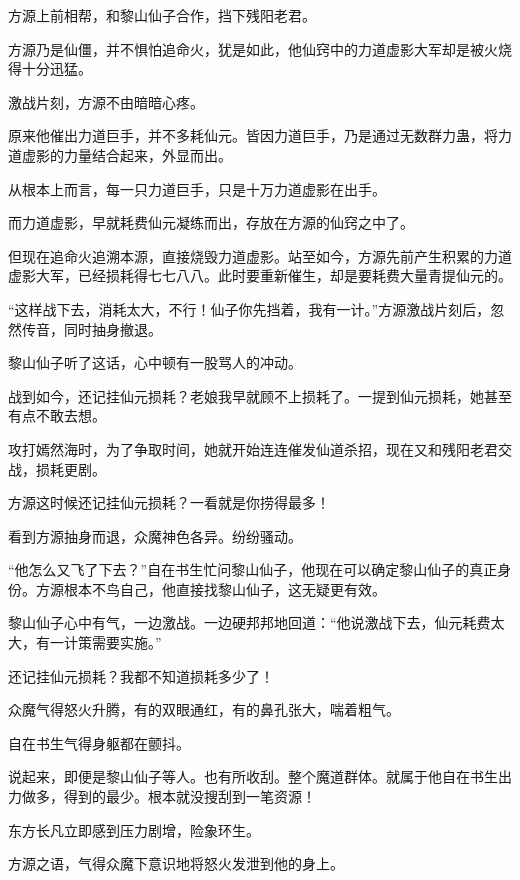 
\begin{this_body}



方源上前相帮，和黎山仙子合作，挡下残阳老君。

方源乃是仙僵，并不惧怕追命火，犹是如此，他仙窍中的力道虚影大军却是被火烧得十分迅猛。

激战片刻，方源不由暗暗心疼。

原来他催出力道巨手，并不多耗仙元。皆因力道巨手，乃是通过无数群力蛊，将力道虚影的力量结合起来，外显而出。

从根本上而言，每一只力道巨手，只是十万力道虚影在出手。

而力道虚影，早就耗费仙元凝练而出，存放在方源的仙窍之中了。

但现在追命火追溯本源，直接烧毁力道虚影。站至如今，方源先前产生积累的力道虚影大军，已经损耗得七七八八。此时要重新催生，却是要耗费大量青提仙元的。

“这样战下去，消耗太大，不行！仙子你先挡着，我有一计。”方源激战片刻后，忽然传音，同时抽身撤退。

黎山仙子听了这话，心中顿有一股骂人的冲动。

战到如今，还记挂仙元损耗？老娘我早就顾不上损耗了。一提到仙元损耗，她甚至有点不敢去想。

攻打嫣然海时，为了争取时间，她就开始连连催发仙道杀招，现在又和残阳老君交战，损耗更剧。

方源这时候还记挂仙元损耗？一看就是你捞得最多！

看到方源抽身而退，众魔神色各异。纷纷骚动。

“他怎么又飞了下去？”自在书生忙问黎山仙子，他现在可以确定黎山仙子的真正身份。方源根本不鸟自己，他直接找黎山仙子，这无疑更有效。

黎山仙子心中有气，一边激战。一边硬邦邦地回道：“他说激战下去，仙元耗费太大，有一计策需要实施。”

还记挂仙元损耗？我都不知道损耗多少了！

众魔气得怒火升腾，有的双眼通红，有的鼻孔张大，喘着粗气。

自在书生气得身躯都在颤抖。

说起来，即便是黎山仙子等人。也有所收刮。整个魔道群体。就属于他自在书生出力做多，得到的最少。根本就没搜刮到一笔资源！

东方长凡立即感到压力剧增，险象环生。

方源之语，气得众魔下意识地将怒火发泄到他的身上。


\end{this_body}
